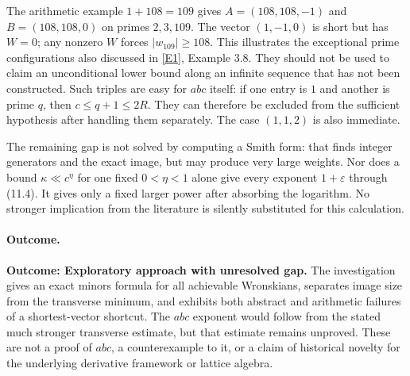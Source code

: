 \documentclass[11pt,a4paper]{article}
\newcommand{\eref}[2]{\hyperlink{extra:#1:#2}{[E#2]}}
\begin{document}
The arithmetic example $1+108=109$ gives
$A=(108,108,-1)$ and $B=(108,108,0)$ on primes $2,3,109$.
The vector $(1,-1,0)$ is short but has $W=0$; any nonzero $W$ forces
$|w_{109}|\geq108$. This illustrates the exceptional prime configurations
also discussed in \eref{13}{1}, Example 3.8. They should not be used to
claim an unconditional lower bound along an infinite sequence that has
not been constructed. Such triples are easy for $abc$ itself: if one
entry is $1$ and another is prime $q$, then $c\leq q+1\leq2R$.
They can therefore be excluded from the sufficient hypothesis after
handling them separately. The case $(1,1,2)$ is also immediate.

The remaining gap is not solved by computing a Smith form: that finds
integer generators and the exact image, but may produce very large
weights. Nor does a bound $\kappa\ll c^\eta$ for one fixed
$0<\eta<1$ alone give every exponent $1+\varepsilon$ through (11.4).
It gives only a fixed larger power after absorbing the logarithm. No
stronger implication from the literature is silently substituted for
this calculation.

\paragraph{Outcome.}
\textbf{Outcome: Exploratory approach with unresolved gap.}
The investigation gives an exact minors formula for all achievable
Wronskians, separates image size from the transverse minimum, and
exhibits both abstract and arithmetic failures of a shortest-vector
shortcut. The $abc$ exponent would follow from the stated much stronger
transverse estimate, but that estimate remains unproved. These are
not a proof of $abc$, a counterexample to it, or a claim of historical
novelty for the underlying derivative framework or lattice algebra.
\end{document}
